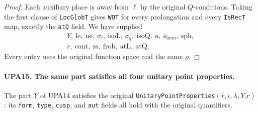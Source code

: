 \documentclass[11pt,a4paper]{article}
\numberwithin{equation}{section}
\theoremstyle{remark}\newtheorem{remark}[theorem]{Remark}
\begin{document}
\begin{proof}
Each auxiliary place is away from $\ell$ by the original
$Q$-conditions.  Taking the first clause of
\texttt{Loc\allowbreak Glob\allowbreak T} gives \texttt{WOT} for every
prolongation and every \texttt{Is\allowbreak Rec\allowbreak T} map, exactly
the \texttt{at\allowbreak Q} field.
We have supplied
\[
\begin{gathered}
Y,\ \mathrm{le},\ \mathrm{ne},\
\sigma_l,\ \mathrm{isoL},\
\sigma_q,\ \mathrm{isoQ},\
a,\ a_{\mathrm{zero}},\ \mathrm{sph},\\
r,\ \mathrm{cont},\ \mathrm{ss},\
\mathrm{frob},\ \mathrm{atL},\ \mathrm{atQ}.
\end{gathered}
\]
Every entry uses the original function space and the same $\rho$.
\end{proof}

\paragraph{UPA15. The same part satisfies all four unitary point properties.}
\label{claim:UPA15}
The part $Y$ of UPA14 satisfies the original
\texttt{Unitary\allowbreak Point\allowbreak Properties}$(\bar r,\iota,\lambda,Y.r)$:
its \texttt{form}, \texttt{type}, \texttt{cusp}, and
\texttt{aut} fields all hold with the original quantifiers.
\end{document}
